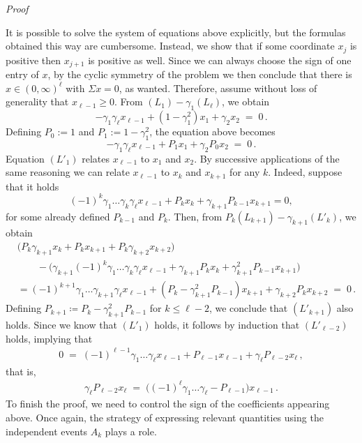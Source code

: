 \documentclass[reqno,a4paper,11pt]{amsart}
\makeatletter
\theoremstyle{remark}
\numberwithin{equation}{section}
\renewenvironment{proof}[1][Proof]{\par
\pushQED{\qed}%
\normalfont \topsep6\p@\@plus6\p@\relax
\trivlist
\item\relax
{\itshape
#1\@addpunct{.}}\hspace\labelsep\ignorespaces
}{%
\popQED\endtrivlist\@endpefalse
}
\makeatother
\begin{document}
\begin{proof}
It is possible to solve the system of equations above explicitly, but the formulas obtained this way are cumbersome. Instead, we show that if some coordinate $x_j$ is positive then $x_{j+1}$ is positive as well. Since we can always choose the sign of one entry of $x$, by the cyclic symmetry of the problem we then conclude that there is $x \in (0,\infty)^{\ell}$ with $\Sigma x = 0$, as wanted.
Therefore, assume without loss of generality that $x_{\ell-1}\geq 0$. From
$(L_1)-\gamma_1(L_\ell)$, we obtain
\begin{equation*}
 -\gamma_1\gamma_\ell x_{\ell-1} +(1-\gamma_1^2)x_1+\gamma_2 x_2\;=\;0\,.
\end{equation*}
Defining $P_0 := 1$ and $P_1 := 1 - \gamma_1^2$, the equation above becomes
\begin{equation}
 -\gamma_1\gamma_\ell x_{\ell-1} +P_1 x_1+\gamma_2 P_0 x_2\;=\;0 \tag{$L'_1$}\,.
\end{equation}
Equation $(L'_1)$ relates $x_{\ell-1}$ to $x_1$ and $x_2$. By successive applications
of the same reasoning we can relate $x_{\ell-1}$ to $x_k$ and $x_{k+1}$ for any
$k$. Indeed, suppose that it holds
\begin{equation}
\tag{$L'_k$}
(-1)^k\gamma_1\dots\gamma_k\gamma_\ell x_{\ell-1}+P_k x_k+\gamma_{k+1}
    P_{k-1}x_{k+1}=0,
\end{equation}
for some already defined $P_{k-1}$ and $P_k$.
Then, from $P_k(L_{k+1})-\gamma_{k+1}(L'_k)$, we obtain
\begin{align*}
    &\bigl(P_k \gamma_{k+1} x_{k}
    + P_k x_{k+1}+P_k \gamma_{k+2} x_{k+2}\bigr) \\
    &\qquad - \bigl(\gamma_{k+1}(-1)^k\gamma_1\dots\gamma_{k}\gamma_\ell x_{\ell-1}
        + \gamma_{k+1} P_k x_k+\gamma_{k+1}^2 P_{k-1}x_{k+1}\bigr) \\
    &= (-1)^{k+1}\gamma_1\dots\gamma_{k+1}\gamma_\ell x_{\ell-1}+
    (P_k -\gamma_{k+1}^2 P_{k-1})x_{k+1}+\gamma_{k+2} P_{k}x_{k+2}
\;=\; 0\,.
\end{align*}
Defining $P_{k+1} \coloneqq P_k - \gamma_{k+1}^2 P_{k-1}$ for $k\leq \ell-2$, we conclude that $(L'_{k+1})$
also holds. Since we know that $(L'_1)$ holds, it follows by induction that
$(L'_{\ell-2})$ holds, implying that
\begin{align*}
0 \;=\; (-1)^{\ell-1}\gamma_1\dots\gamma_\ell x_{\ell-1}+
    P_{\ell-1} x_{\ell-1}+\gamma_{\ell} P_{\ell-2}x_{\ell}\,,
\end{align*}
that is,
\begin{align*}
\gamma_{\ell} P_{\ell-2}x_{\ell}
\;=\; \bigl((-1)^{\ell}\gamma_1\dots\gamma_\ell - P_{\ell-1}\bigr) x_{\ell-1}\,.
\end{align*}
To finish the proof, we need to control the sign of the coefficients appearing
above. Once again, the strategy of expressing relevant quantities using the
independent events $A_k$ plays a role.


\end{proof}
\end{document}

